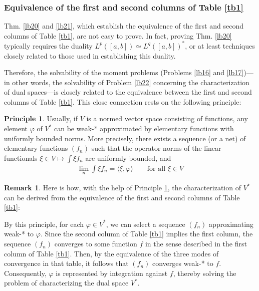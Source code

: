\documentclass[12pt,b5paper,notitlepage]{article}
\theoremstyle{definition}
\newtheorem{rem}[df]{Remark}
\newtheorem{principle}[df]{Principle}
\theoremstyle{plain}
\newcommand{\bk}[1]{\langle {#1}\rangle}
\newcommand{\hqed}{\hfill\qedsymbol}
\numberwithin{equation}{section}
\begin{document}
\subsubsection{Equivalence of the first and second columns of Table \ref{tb1}}\label{lb107}



Thm. \ref{lb20} and \ref{lb21}, which establish the equivalence of the first and second columns of Table \ref{tb1}, are not easy to prove. In fact, proving Thm. \ref{lb20} typically requires the duality $L^p([a,b])\simeq L^q([a,b])^*$, or at least techniques closely related to those used in establishing this duality. 


Therefore, the solvability of the moment problems (Problems \ref{lb16} and \ref{lb17})---in other words, the solvability of Problem \ref{lb22} concerning the characterization of dual spaces---is closely related to the equivalence between the first and second columns of Table \ref{tb1}. This close connection rests on the following principle:

\begin{principle}\label{lb23}
Usually, if $V$ is a normed vector space consisting of functions,  any element $\varphi$ of $V^*$ can be weak-* approximated by elementary functions with uniformly bounded norms. More precisely, there exists a sequence (or a net) of elementary functions $(f_n)$ such that the operator norms of the linear functionals $\xi\in V\mapsto\int \xi f_n$ are uniformly bounded, and
\begin{align*}
\lim_n \int\xi f_n=\bk{\xi,\varphi}\qquad\text{for all }\xi\in V
\end{align*}
\end{principle}


\begin{rem}\label{lb110}
Here is how, with the help of Principle \ref{lb23}, the characterization of $V^*$ can be derived from the equivalence of the first and second columns of Table \ref{tb1}: 

By this principle, for each $\varphi\in V^*$, we can select a sequence $(f_n)$  approximating weak-* to $\varphi$. Since the second column of Table \ref{tb1} implies the first column, the sequence $(f_n)$ converges to some function $f$ in the sense described in the first column of Table \ref{tb1}. Then, by the equivalence of the three modes of convergence in that table, it follows that $(f_n)$ converges weak-* to $f$. Consequently, $\varphi$ is represented by integration against $f$, thereby solving the problem of characterizing the dual space $V^*$. \hqed
\end{rem}
\end{document}
